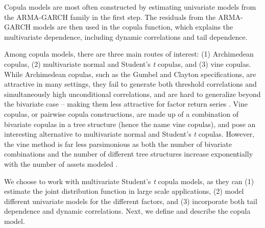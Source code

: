 Copula models are most often constructed by estimating univariate models from the ARMA-GARCH family in the first step. The residuals from the ARMA-GARCH models are then used in the copula function, which explains the multivariate dependence, including dynamic correlations and tail dependence.

Among copula models, there are three main routes of interest: (1) Archimedean copulas, (2) multivariate normal and Student's \textit{t} copulas, and (3) vine copulas. While Archimedean copulas, such as the Gumbel and Clayton specifications, are attractive in many settings, they fail to generate both threshold correlations and simultaneously high unconditional correlations, and are hard to generalize beyond the bivariate case -- making them less attractive for factor return series \textcite{ChristoffersenLanglois2013}. Vine copulas, or pairwise copula constructions, are made up of a combination of bivariate copulas in a tree structure (hence the name vine copulas), and pose an interesting alternative to multivariate normal and Student's \textit{t} copulas. However, the vine method is far less parsimonious as both the number of bivariate combinations and the number of different tree structures increase exponentially with the number of assets modeled \autocite{Aas2009}.

We choose to work with multivariate Student's \textit{t} copula models, as they can (1) estimate the joint distribution function in large scale applications, (2) model different univariate models for the different factors, and (3) incorporate both tail dependence and dynamic correlations. Next, we define and describe the copula model.